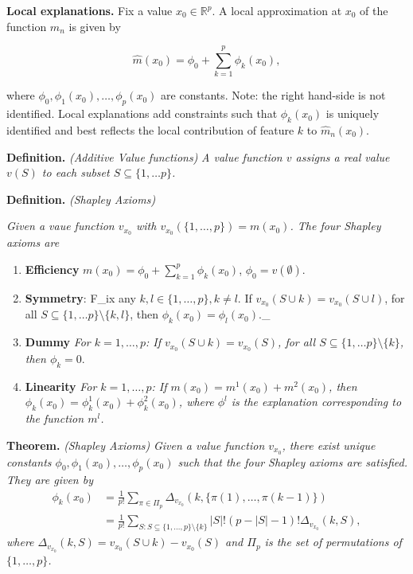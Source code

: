 \documentclass[a4paper,12pt,openany]{book}
\providecommand{\tightlist}{%
 \setlength{\itemsep}{0pt}\setlength{\parskip}{0pt}}
\begin{document}
\textbf{Local explanations.} Fix a value \(x_0 \in \mathbb R^p\). A local approximation at \(x_0\) of the function \(\hat m_n\) is given by

\[
\hat m\left(x_0\right)=\phi_{0}+\sum_{k=1}^{p} \phi_k(x_0),
\]

where \(\phi_0,\phi_1(x_0),\dots,\phi_p(x_0)\) are constants. Note: the right hand-side is not identified. Local explanations add constraints such that \(\phi_k(x_0)\) is uniquely identified and best reflects the local contribution of feature \(k\) to \(\hat m_n\left(x_0\right)\).

\textbf{Definition.} \emph{(Additive Value functions)} \emph{A value function \(v\) assigns a real value
\(v(S)\) to each subset \(S \subseteq \{1,\dots p\}\).}

\textbf{Definition.} \emph{(Shapley Axioms)}

\emph{Given a vaue function \(v_{x_0}\) with \(v_{x_0}(\{1,\dots,p\})=m(x_0)\). The four Shapley axioms are}

\begin{enumerate}
\def\labelenumi{\arabic{enumi}.}
\tightlist
\item
  \textbf{Efficiency} \(m\left(x_0\right)=\phi_{0}+\sum_{k=1}^{p} \phi_k(x_0)\), \(\phi_{0}=v(\emptyset)\).
\item
  \textbf{Symmetry}: F\_ix any \(k,l \in \{1,\dots,p\}, k\neq l\). If \(v_{x_0}(S\cup k)=v_{x_0}(S\cup l)\), for all \(S \subseteq \{1,\dots p\}\setminus \{k,l\}\), then \(\phi_k(x_0)=\phi_l(x_0).\)\_
\item
  \textbf{Dummy} \emph{For \(k=1,\dots,p\): If \(v_{x_0}(S\cup k)=v_{x_0}(S)\), for all \(S \subseteq \{1,\dots p\}\setminus \{k\}\), then \(\phi_k=0.\)}
\item
  \textbf{Linearity} \emph{For \(k=1,\dots,p\): If \(m(x_0)=m^1(x_0)+m^2(x_0)\), then \(\phi_k(x_0)=\phi^1_k(x_0)+\phi^2_k(x_0)\), where \(\phi^l\) is the explanation corresponding to the function \(m^l\).}
\end{enumerate}

\textbf{Theorem.} \emph{(Shapley Axioms)} \emph{Given a value function \(v_{x_0}\), there exist unique constants \(\phi_0,\phi_1(x_0),\dots,\phi_p(x_0)\) such that the four Shapley axioms are satisfied. They are given by}
\begin{align}
\phi_{k}(x_0)&=\frac{1}{p !} \sum_{\pi \in \Pi_p} \Delta_{v_{x_0}}\left(k, \{\pi(1),\dots,\pi(k-1)\}\right)\\
&=\frac 1 {p!}\sum_{S: S \subseteq \{1,\dots,p\} \setminus\{k\}} {|S| !(p -|S|-1) !}\Delta_{v_{x_0}}(k, S),
\end{align}
\emph{where \(\Delta_{v_{x_0}}(k, S)=v_{x_0}(S \cup k)-v_{x_0}(S)\) and \(\Pi_p\) is the set of permutations of \(\{1,\dots,p\}\).}
\end{document}
